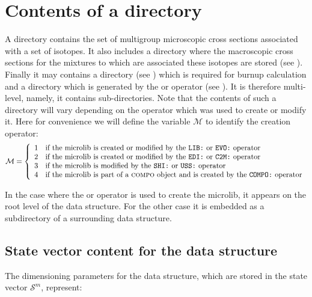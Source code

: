\section{Contents of a  directory}\label{sect:microlibdir}

A  directory contains the set of multigroup microscopic 
cross sections associated with a set of isotopes. It also includes a  directory
where the macroscopic cross sections for the mixtures to which are associated these
isotopes are stored (see ). Finally it may contains a  directory
(see
) which is required for burnup calculation and a 
directory which is generated by the  or  operator (see
). It is
therefore multi-level, namely, it contains sub-directories. Note that the contents of such a
directory will vary depending on the operator which was used to create or modify it. Here for
convenience we will define the variable
$\mathcal{M}$ to identify the creation operator:
\begin{displaymath}
\mathcal{M} = \left\{
\begin{array}{ll}
1 & \textrm{if the microlib is created or modified by the \moc{LIB:} or \moc{EVO:} operator}\\
2 & \textrm{if the microlib is created or modified by the \moc{EDI:} or
\moc{C2M:} operator}\\
3 & \textrm{if the microlib is modified by the \moc{SHI:} or \moc{USS:} operator}\\
4 & \textrm{if the microlib is part of a {\sc compo} object and is created by the \moc{COMPO:} operator}
\end{array} \right.
\end{displaymath}

In the case where the  or  operator is used to create the microlib, it appears on the root
level of the data structure. For the other case it is embedded as a
subdirectory of a surrounding data structure.

\subsection{State vector content for the  data structure}\label{sect:microlibstate}

The dimensioning parameters for the  data structure, which are stored in
the state vector $\mathcal{S}^{m}$, represent:

